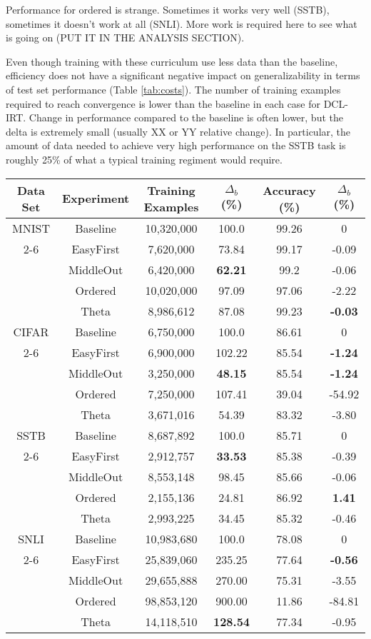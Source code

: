 \documentclass[letterpaper]{article} %
\begin{document}
Performance for ordered is strange.
Sometimes it works very well (SSTB), sometimes it doesn't work at all (SNLI).
More work is required here to see what is going on (PUT IT IN THE ANALYSIS SECTION).

Even though training with these curriculum use less data than the baseline, efficiency does not have a significant negative impact on generalizability in terms of test set performance (Table \ref{tab:costs}).
The number of training examples required to reach convergence is lower than the baseline in each case for DCL-IRT.
Change in performance compared to the baseline is often lower, but the delta is extremely small (usually XX or YY relative change). 
In particular, the amount of data needed to achieve very high performance on the SSTB task is roughly 25\% of what a typical training regiment would require.


\begin{table*}[h!]
	\centering 
	\begin{tabular}{cccccc}
		\toprule
		Data Set & Experiment & Training Examples & $\Delta_b$ (\%) & Accuracy (\%) & $\Delta_b$ (\%)\\ 
		\midrule
		MNIST & Baseline & 10,320,000& 100.0&	99.26&	0
		 \\
		 \cmidrule{2-6}
		& EasyFirst & 7,620,000&	73.84&	99.17&	-0.09
		 \\
		& MiddleOut & 6,420,000	&\bf 62.21	&99.2&	-0.06
		 \\
		& Ordered &10,020,000&	97.09&	97.06&	-2.22
		 \\
		& Theta& 8,986,612&	87.08&	99.23&	\bf -0.03
		 \\
		\midrule
		CIFAR & Baseline &  6,750,000& 	100.0&	86.61&	0
		 \\
		 \cmidrule{2-6}
		& EasyFirst & 6,900,000&	102.22&	85.54	&\bf -1.24
		 \\
		& MiddleOut & 3,250,000&	\bf 48.15&	85.54&	\bf -1.24
		 \\
		& Ordered &7,250,000&	107.41&	39.04	&-54.92
		 \\
		& Theta &3,671,016	&54.39&	83.32&	-3.80
		 \\
		\midrule
		SSTB & Baseline &  8,687,892 	&100.0	&85.71&	0
		\\
		\cmidrule{2-6}
		& EasyFirst & 2,912,757	&\bf 33.53&	85.38&	-0.39
		 \\
		& MiddleOut & 8,553,148	&98.45&	85.66&	-0.06
		 \\
		& Ordered & 2,155,136&	24.81&	86.92&	\bf 1.41
		 \\
		& Theta &2,993,225&	34.45&	85.32&	-0.46
		 \\
		\midrule
		SNLI & Baseline &  10,983,680& 	100.0&	78.08&	0
		 \\
		 \cmidrule{2-6}
		& EasyFirst & 25,839,060&	235.25&	77.64& \bf	-0.56
		 \\
		& MiddleOut &29,655,888&	270.00&	75.31&	-3.55
		 \\
		& Ordered & 98,853,120&	900.00&	11.86&	-84.81
		 \\
		& Theta& 14,118,510&	\bf 128.54&	77.34&	-0.95
		 \\
		\bottomrule 
	\end{tabular}
	\label{tab:costs}
\end{table*}
\end{document}

